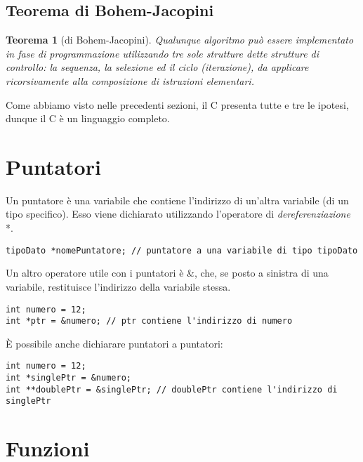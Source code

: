 \subsection{Teorema di Bohem-Jacopini}
\newtheorem*{theorem}{Teorema}
\begin{theorem}[di Bohem-Jacopini]
	Qualunque algoritmo può essere implementato in fase di programmazione utilizzando tre sole strutture dette strutture di controllo: la \textit{sequenza}, la \textit{selezione} ed il \textit{ciclo} (iterazione), da applicare ricorsivamente alla composizione di istruzioni elementari.
\end{theorem}
Come abbiamo visto nelle precedenti sezioni, il C presenta tutte e tre le ipotesi, dunque il C è un linguaggio completo.

\section{Puntatori}\label{puntatori}
Un puntatore è una variabile che contiene l’indirizzo di un’altra variabile (di un tipo specifico). Esso viene dichiarato utilizzando l’operatore di \textit{dereferenziazione} \colorbox{light-gray}{*}. 
\begin{lstlisting}[title = {Dichiarazione generica di una variabile puntatore}]
tipoDato *nomePuntatore; // puntatore a una variabile di tipo tipoDato
\end{lstlisting}

Un altro operatore utile con i puntatori è \colorbox{light-gray}{\&}, che, se posto a sinistra di una variabile, restituisce l’indirizzo della variabile stessa.
\begin{lstlisting}[title = {Utilizzo dell'operatore \&}]
int numero = 12;
int *ptr = &numero; // ptr contiene l'indirizzo di numero
\end{lstlisting}

\`{E} possibile anche dichiarare puntatori a puntatori:
\begin{lstlisting}[title = {Puntatori di puntatori}]
int numero = 12;
int *singlePtr = &numero; 
int **doublePtr = &singlePtr; // doublePtr contiene l'indirizzo di singlePtr
\end{lstlisting}

\section{Funzioni}\label{funzioni}
